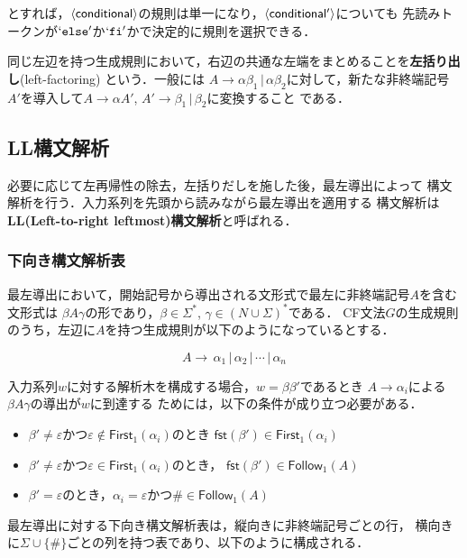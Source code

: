 \documentclass[dvipdfmx,a4j]{jbook}
\begin{document}
とすれば，$\langle{\mbox{$\mathsf{conditional}$}}\rangle$の規則は単一になり，$\langle{\mbox{$\mathsf{conditional'}$}}\rangle$についても
先読みトークンが$`\mbox{$\mathtt{else}$}'$か$`\mbox{$\mathtt{fi}$}'$かで決定的に規則を選択できる．

同じ左辺を持つ生成規則において，右辺の共通な左端をまとめることを{\bf 左括り出し}(left-factoring)
という．一般には $A\rightarrow \alpha\beta_1\,|\,\alpha\beta_2$に対して，新たな非終端記号
$A'$を導入して$A\rightarrow \alpha A'$, $A'\rightarrow\beta_1\,|\,\beta_2$に変換すること
である．

\subsection{LL構文解析}

必要に応じて左再帰性の除去，左括りだしを施した後，最左導出によって
構文解析を行う．入力系列を先頭から読みながら最左導出を適用する
構文解析は{\bf LL(Left-to-right leftmost)構文解析}と呼ばれる．

\subsubsection{下向き構文解析表}

最左導出において，開始記号から導出される文形式で最左に非終端記号$A$を含む文形式は
$\beta A\gamma$の形であり，$\beta\in\Sigma^\ast$, $\gamma\in(N\cup\Sigma)^\ast$である．
CF文法$G$の生成規則のうち，左辺に$A$を持つ生成規則が以下のようになっているとする．

\[A\rightarrow\,\alpha_1\,|\,\alpha_2\,|\,\cdots\,|\,\alpha_n\]

入力系列$w$に対する解析木を構成する場合，$w=\beta\beta'$であるとき
$A\rightarrow\alpha_i$による$\beta A\gamma$の導出が$w$に到達する
ためには，以下の条件が成り立つ必要がある．

\begin{itemize}
  \item $\beta'\not=\varepsilon$かつ$\varepsilon\notin\mathsf{First}_1(\alpha_i)$のとき
  $\mathsf{fst}(\beta')\in\mathsf{First}_1(\alpha_i)$ 
  \item $\beta'\not=\varepsilon$かつ$\varepsilon\in\mathsf{First}_1(\alpha_i)$のとき，
  $\mathsf{fst}(\beta')\in\mathsf{Follow}_1(A)$
  \item $\beta'=\varepsilon$のとき，$\alpha_i=\varepsilon$かつ$\#\in\mathsf{Follow}_1(A)$
\end{itemize}

最左導出に対する下向き構文解析表は，縦向きに非終端記号ごとの行，
横向きに$\Sigma\cup\{\#\}$ごとの列を持つ表であり、以下のように構成される．
\end{document}
